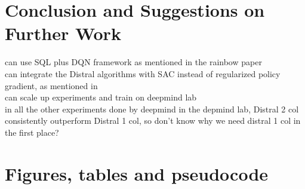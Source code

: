 \documentclass[12pt]{report}
\begin{document}
\chapter{Conclusion and Suggestions on Further Work}

can use SQL plus DQN framework as mentioned in the rainbow paper \cite{hessel2018rainbow}\\

can integrate the Distral algorithms with SAC instead of regularized policy gradient, as mentioned in \cite{haarnoja2018soft}\\

can scale up experiments and train on deepmind lab\\

in all the other experiments done by deepmind in the depmind lab, Distral 2 col consistently outperform Distral 1 col, so don't know why we need distral 1 col in the first place?

\appendix




\chapter{Figures, tables and pseudocode}
\end{document}

